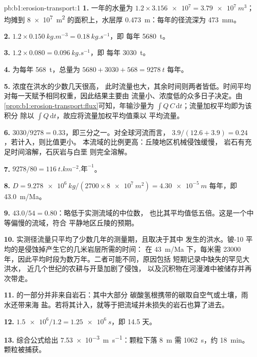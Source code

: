 \begin{solution}{pb:b1:erosion-transport:1}
\textbf{1.} 一年的水量为 $1.2 \times \num{3.156e7} = \qty{3.79e7}{m^3}$；
均摊到 \qty{8e7}{m^2} 的面积上，水层厚 \qty{0.473}{m}：每年的径流深为
\qty{473}{mm}。

\textbf{2.} $1.2 \times \qty{0.150}{kg.m^{-3}} = \qty{0.18}{kg.s^{-1}}$，即
每年 \qty{5680}{t}。

\textbf{3.} $1.2 \times 0.080 = \qty{0.096}{kg.s^{-1}}$，即
每年 \qty{3030}{t}。

\textbf{4.} 为每年 \qty{568}{t}，总量为 $5680 + 3030 +
568 = \qty{9278}{t}$ 每年。

\textbf{5.} 浓度在洪水的少数几天很高，
此时流量也大，其余时间则两者皆低。时间平均
对每一天赋予相同权重，因此结果主要由
流量小、浓度低的众多日子决定。由
\cref{prop:b1:erosion-transport:flux}可知，年输沙量为
$\int Q\,C\,\mathrm dt$；流量加权平均即为该积分
除以 $\int Q\,\mathrm dt$，故应将流量加权平均值乘以
平均流量。

\textbf{6.} $3030/9278 = \num{0.33}$，即三分之一。对全球河流而言，
$3.9/(12.6 + 3.9) = \num{0.24}$，若计入，则比值更小。
本流域的比例更高：丘陵地区机械侵蚀缓慢，
岩石有充足时间溶解，石灰岩与白垩
则完全溶解。

\textbf{7.} $9278/80 = \qty{116}{t.km^{-2}.\text{年}^{-1}}$。

\textbf{8.} $D = \qty{9.278e6}{kg}/(2700 \times \qty{8e7}{m^2}) =
\qty{4.30e-5}{m}$ 每年，即 \qty{43.0}{m/Ma}。

\textbf{9.} $43.0/54 = 0.80$：略低于实测流域的中位数，
也比其平均值低五倍。这是一个中等偏慢的流域，符合
平静地区丘陵的预期。

\textbf{10.} 实测径流量只平均了少数几年的测量期，且取决于其中
发生的洪水。铍-10 平均的是侵蚀掉产生它的几米岩层所需的时间：
在 \qty{43}{m/Ma} 下，每米需
\num{23000} 年，因此平均时段为数万年。二者可能不同，原因包括
短期记录中缺失的罕见大洪水，
近几个世纪的农耕与开垦加剧了侵蚀，
以及沉积物在河漫滩中被储存并再次带走。

\textbf{11.} 的一部分并非来自岩石：其中大部分
碳酸氢根携带的碳取自空气或土壤，雨水还带来海
盐。若将其计入，就等于把流域并未损失的岩石也算了进去。

\textbf{12.} $\num{1.5e6}/1.2 = \qty{1.25e6}{s}$，即 \num{14.5} 天。

\textbf{13.} 综合公式给出 \qty{7.53e-3}{m.s^{-1}}：颗粒下落
\qty{8}{m} 需 \qty{1062}{s}，约 \qty{18}{min}。颗粒被捕获。


\end{solution}

